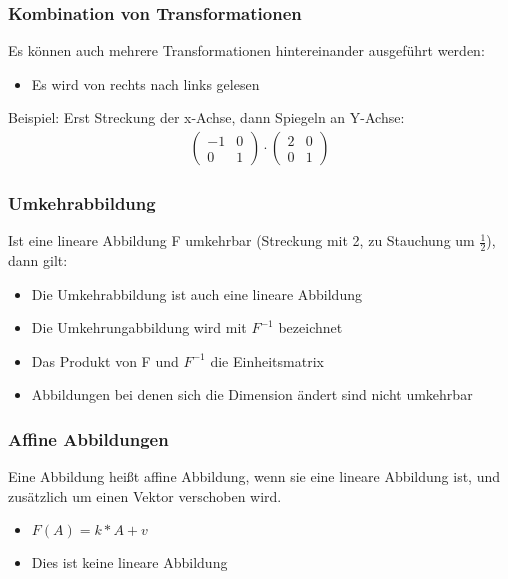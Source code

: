 \begin{frame}
	\frametitle{Kombination von Transformationen}
	Es können auch mehrere Transformationen hintereinander ausgeführt werden:
	\begin{itemize}
		\item Es wird von rechts nach links gelesen
	\end{itemize}
	Beispiel:
	Erst Streckung der x-Achse, dann Spiegeln an Y-Achse:
	\begin{gather*}
	\begin{pmatrix}
		-1 & 0 \\
		0 & 1
	\end{pmatrix} \cdot
	\begin{pmatrix}
		2 & 0 \\
		0 & 1
	\end{pmatrix} \end{gather*}
\end{frame}

\begin{frame}
	\frametitle{Umkehrabbildung}
	Ist eine lineare Abbildung F umkehrbar (Streckung mit 2, zu Stauchung um $\frac{1}{2}$), dann gilt:
	\begin{itemize}
		\item Die Umkehrabbildung ist auch eine lineare Abbildung
		\item Die Umkehrungabbildung wird mit $F^{-1}$ bezeichnet
		\item Das Produkt von F und $F^{-1}$ die Einheitsmatrix
		\item Abbildungen bei denen sich die Dimension ändert sind nicht umkehrbar
	\end{itemize}
\end{frame}

\begin{frame}
	\frametitle{Affine Abbildungen}
	Eine Abbildung heißt affine Abbildung, wenn sie eine lineare Abbildung ist, und zusätzlich um einen Vektor verschoben wird.
	\begin{itemize}
		\item $F(A) = k*A + v$
		\item Dies ist keine lineare Abbildung
	\end{itemize}
\end{frame}


